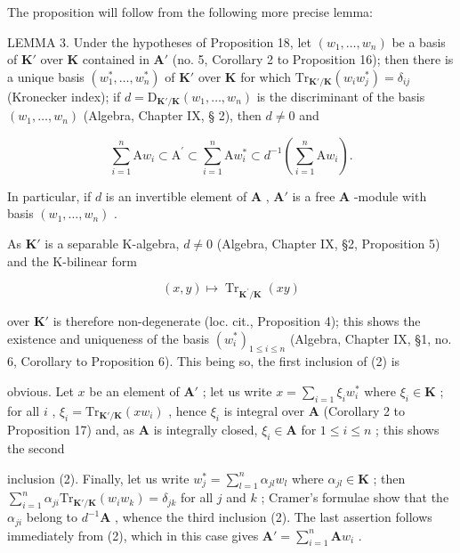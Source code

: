 The proposition will follow from the following more precise lemma:

LEMMA 3. Under the hypotheses of Proposition 18, let \((w_{1},\ldots ,w_{n})\) be a basis of \(\mathbf{K}'\) over \(\mathbf{K}\) contained in \(\mathbf{A}'\) (no. 5, Corollary 2 to Proposition 16); then there is a unique basis \((w_{1}^{*},\dots ,w_{n}^{*})\) of \(\mathbf{K}'\) over \(\mathbf{K}\) for which \(\mathrm{Tr}_{\mathbf{K}' / \mathbf{K}}(w_i w_j^*) = \delta_{ij}\) (Kronecker index); if \(d = \mathrm{D}_{\mathbf{K}' / \mathbf{K}}(w_1,\dots ,w_n)\) is the discriminant of the basis \((w_{1},\dots ,w_{n})\) (Algebra, Chapter IX, § 2), then \(d\neq 0\) and

\[
\sum_ {i = 1} ^ {n} \mathrm{A} w _ {i} \subset \mathrm{A} ^ {\prime} \subset \sum_ {i = 1} ^ {n} \mathrm{A} w _ {i} ^ {*} \subset d ^ {- 1} \left(\sum_ {i = 1} ^ {n} \mathrm{A} w _ {i}\right).\tag{2}
\]

In particular, if \(d\) is an invertible element of \(\mathbf{A}\) , \(\mathbf{A}'\) is a free \(\mathbf{A}\) -module with basis \((w_1, \ldots, w_n)\) .

As \(\mathbf{K}'\) is a separable K-algebra, \(d \neq 0\) (Algebra, Chapter IX, §2, Proposition 5) and the K-bilinear form

\[
(x, y) \mapsto \operatorname{Tr} _ {\mathbf {K} ^ {\prime} / \mathbf {K}} (x y)
\]

over \(\mathbf{K}'\) is therefore non-degenerate (loc. cit., Proposition 4); this shows the existence and uniqueness of the basis \((w_{i}^{*})_{1\leqslant i\leqslant n}\) (Algebra, Chapter IX, §1, no. 6, Corollary to Proposition 6). This being so, the first inclusion of (2) is

obvious. Let \(x\) be an element of \(\mathbf{A}'\) ; let us write \(x = \sum_{i=1} \xi_i w_i^*\) where \(\xi_i \in \mathbf{K}\) ; for all \(i\) , \(\xi_i = \mathrm{Tr}_{\mathbf{K}' / \mathbf{K}}(xw_i)\) , hence \(\xi_i\) is integral over \(\mathbf{A}\) (Corollary 2 to Proposition 17) and, as \(\mathbf{A}\) is integrally closed, \(\xi_i \in \mathbf{A}\) for \(1 \leqslant i \leqslant n\) ; this shows the second

inclusion (2). Finally, let us write \(w_{j}^{*} = \sum_{l=1}^{n} \alpha_{jl} w_{l}\) where \(\alpha_{jl} \in \mathbf{K}\) ; then \(\sum_{i=1}^{n} \alpha_{ji} \mathrm{Tr}_{\mathbf{K}'/\mathbf{K}}(w_i w_k) = \delta_{jk}\) for all \(j\) and \(k\) ; Cramer's formulae show that the \(\alpha_{ji}\) belong to \(d^{-1}\mathbf{A}\) , whence the third inclusion (2). The last assertion follows immediately from (2), which in this case gives \(\mathbf{A}' = \sum_{i=1}^{n} \mathbf{A}w_i\) .

